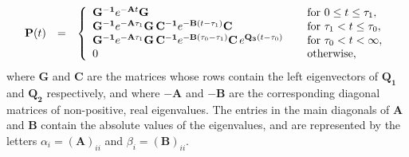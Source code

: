 \documentclass[11pt]{article}
\begin{document}
\begin{equation}
\label{eq:p(t)_decomposition}
\begin{array}{lcl}
 \mathbf{P}(t) &=&\left\{
  \begin{array}{l l}
    \mathbf{G^{-1}}e^{\mathbf{-A}t}\mathbf{G}\quad& \quad \text{for } 0 \leq t \leq \tau_{1},\\
   \mathbf{G^{-1}}e^{\mathbf{-A}\tau_{1}}\mathbf{G}\,\mathbf{C^{-1}}e^{\mathbf{-B}(t-\tau_{1})}\mathbf{C}  \quad  & \quad \text{for } \tau_{1} < t \leq \tau_{0},\\
   \mathbf{G^{-1}}e^{\mathbf{-A}\tau_{1}}\mathbf{G}\,\mathbf{C^{-1}}e^{\mathbf{-B}(\tau_{0}-\tau_{1})}\mathbf{C}\, e^{\mathbf{Q_{3}}\left(t-\tau_{0}\right)} \,  & \quad \text{for } \tau_{0} < t< \infty,\\
0\quad &\quad \text{otherwise},
  \end{array} \right.
  \end{array}
\end{equation} 
where $\mathbf{G}$ and $\mathbf{C}$ are the matrices whose rows contain the left eigenvectors of $\mathbf{Q_{1}}$ and $\mathbf{Q_{2}}$ respectively, and where $\mathbf{-A}$ and $\mathbf{-B}$ are the corresponding diagonal matrices of non-positive, real eigenvalues. The entries in the main diagonals of $\mathbf{A}$ and $\mathbf{B}$ contain the absolute values of the eigenvalues, and  are represented by the letters $\alpha_{i}=\mathbf{(A)}_{ii}$ and $\beta_{i}=\mathbf{(B)}_{ii}$.
\end{document}
